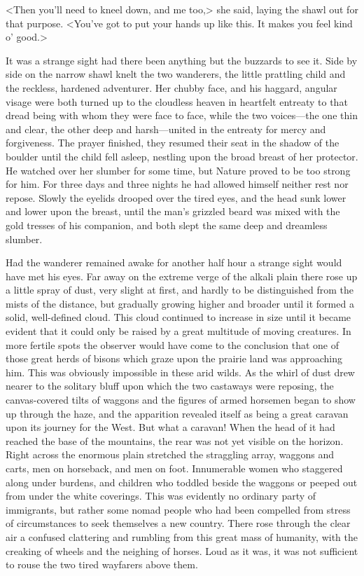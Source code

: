 <Then you'll need to kneel down, and me too,> she said, laying the shawl out for that purpose. <You've got to put your hands up like this. It makes you feel kind o' good.>

It was a strange sight had there been anything but the buzzards to see it. Side by side on the narrow shawl knelt the two wanderers, the little prattling child and the reckless, hardened adventurer. Her chubby face, and his haggard, angular visage were both turned up to the cloudless heaven in heartfelt entreaty to that dread being with whom they were face to face, while the two voices—the one thin and clear, the other deep and harsh—united in the entreaty for mercy and forgiveness. The prayer finished, they resumed their seat in the shadow of the boulder until the child fell asleep, nestling upon the broad breast of her protector. He watched over her slumber for some time, but Nature proved to be too strong for him. For three days and three nights he had allowed himself neither rest nor repose. Slowly the eyelids drooped over the tired eyes, and the head sunk lower and lower upon the breast, until the man's grizzled beard was mixed with the gold tresses of his companion, and both slept the same deep and dreamless slumber.

Had the wanderer remained awake for another half hour a strange sight would have met his eyes. Far away on the extreme verge of the alkali plain there rose up a little spray of dust, very slight at first, and hardly to be distinguished from the mists of the distance, but gradually growing higher and broader until it formed a solid, well-defined cloud. This cloud continued to increase in size until it became evident that it could only be raised by a great multitude of moving creatures. In more fertile spots the observer would have come to the conclusion that one of those great herds of bisons which graze upon the prairie land was approaching him. This was obviously impossible in these arid wilds. As the whirl of dust drew nearer to the solitary bluff upon which the two castaways were reposing, the canvas-covered tilts of waggons and the figures of armed horsemen began to show up through the haze, and the apparition revealed itself as being a great caravan upon its journey for the West. But what a caravan! When the head of it had reached the base of the mountains, the rear was not yet visible on the horizon. Right across the enormous plain stretched the straggling array, waggons and carts, men on horseback, and men on foot. Innumerable women who staggered along under burdens, and children who toddled beside the waggons or peeped out from under the white coverings. This was evidently no ordinary party of immigrants, but rather some nomad people who had been compelled from stress of circumstances to seek themselves a new country. There rose through the clear air a confused clattering and rumbling from this great mass of humanity, with the creaking of wheels and the neighing of horses. Loud as it was, it was not sufficient to rouse the two tired wayfarers above them.

